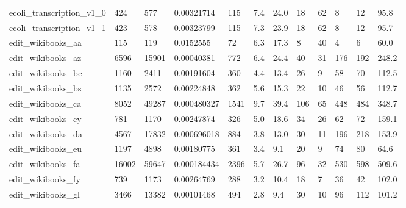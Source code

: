 \begin{longtable}{llllllllllll}
 ecoli\_transcription\_v1\_0                           & 424        & 577       & 0.00321714  & 115   & 7.4    & 24.0   & 18    & 62     & 8      & 12     & 95.8    \\
 ecoli\_transcription\_v1\_1                           & 423        & 578       & 0.00323799  & 115   & 7.3    & 23.9   & 18    & 62     & 8      & 12     & 95.7    \\
 edit\_wikibooks\_aa                                  & 115        & 119       & 0.0152555   & 72    & 6.3    & 17.3   & 8     & 40     & 4      & 6      & 60.0    \\
 edit\_wikibooks\_az                                  & 6596       & 15901     & 0.00040381  & 772   & 6.4    & 24.4   & 40    & 31     & 176    & 192    & 248.2   \\
 edit\_wikibooks\_be                                  & 1160       & 2411      & 0.00191604  & 360   & 4.4    & 13.4   & 26    & 9      & 58     & 70     & 112.5   \\
 edit\_wikibooks\_bs                                  & 1135       & 2572      & 0.00224848  & 362   & 5.6    & 15.3   & 22    & 10     & 46     & 56     & 112.7   \\
 edit\_wikibooks\_ca                                  & 8052       & 49287     & 0.000480327 & 1541  & 9.7    & 39.4   & 106   & 65     & 448    & 484    & 348.7   \\
 edit\_wikibooks\_cy                                  & 781        & 1170      & 0.00247874  & 326   & 5.0    & 18.6   & 34    & 26     & 62     & 72     & 159.1   \\
 edit\_wikibooks\_da                                  & 4567       & 17832     & 0.000696018 & 884   & 3.8    & 13.0   & 30    & 11     & 196    & 218    & 153.9   \\
 edit\_wikibooks\_eu                                  & 1197       & 4898      & 0.00180775  & 361   & 3.4    & 9.1    & 20    & 9      & 74     & 80     & 64.6    \\
 edit\_wikibooks\_fa                                  & 16002      & 59647     & 0.000184434 & 2396  & 5.7    & 26.7   & 96    & 32     & 530    & 598    & 509.6   \\
 edit\_wikibooks\_fy                                  & 739        & 1173      & 0.00264769  & 288   & 3.2    & 10.4   & 18    & 7      & 36     & 42     & 102.0   \\
 edit\_wikibooks\_gl                                  & 3466       & 13382     & 0.00101468  & 494   & 2.8    & 9.4    & 30    & 10     & 96     & 112    & 101.2   \\

\end{longtable}
